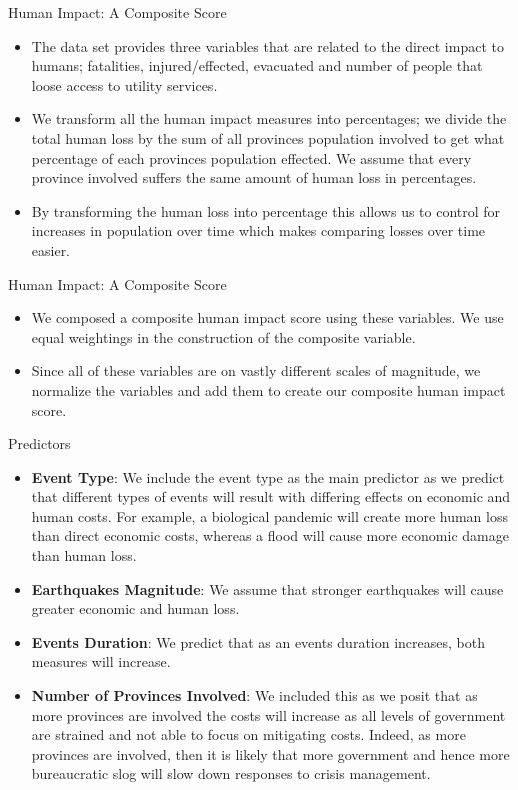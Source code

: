 \begin{frame}{Human Impact: A Composite Score}
	\begin{itemize}
		\item The data set provides three variables that are related to the direct impact to humans; fatalities, injured/effected, evacuated and number of people that loose access to utility services. 
\item We transform all the human impact measures into percentages; we divide the total human loss by the sum of all provinces population involved to get what percentage of each provinces population effected. We assume that every province involved suffers the same amount of human loss in percentages. 
\item By transforming the human loss into percentage this allows us to control for increases in population over time which makes comparing losses over time easier.

	\end{itemize}
	
\end{frame}

\begin{frame}{Human Impact: A Composite Score}
\begin{itemize}

	\item We composed a composite human impact score using these variables. We use equal weightings in the construction of the composite variable.
	\item Since all of these variables are on vastly different scales of magnitude, we normalize the variables and add them to create our composite human impact score. 
\end{itemize}

\end{frame}

\begin{frame}{Predictors}
\begin{itemize}
	\item \textbf{Event Type}: We include the event type as the main predictor as we predict that different types of events will result with differing effects on economic and human costs. For example, a biological pandemic will create more human loss than direct economic costs, whereas a flood will cause more economic damage than human loss.
	\item \textbf{Earthquakes Magnitude}: We assume that stronger earthquakes will cause greater economic and human loss.
	\item \textbf{Events Duration}: We predict that as an events duration increases, both measures will increase. 
	\item \textbf{Number of Provinces Involved}: We included this as we posit that as more provinces are involved the costs will increase as all levels of government are strained and not able to focus on mitigating costs. Indeed, as more provinces are involved, then it is likely that more government and hence more bureaucratic slog will slow down responses to crisis management.

\end{itemize}
\end{frame}

